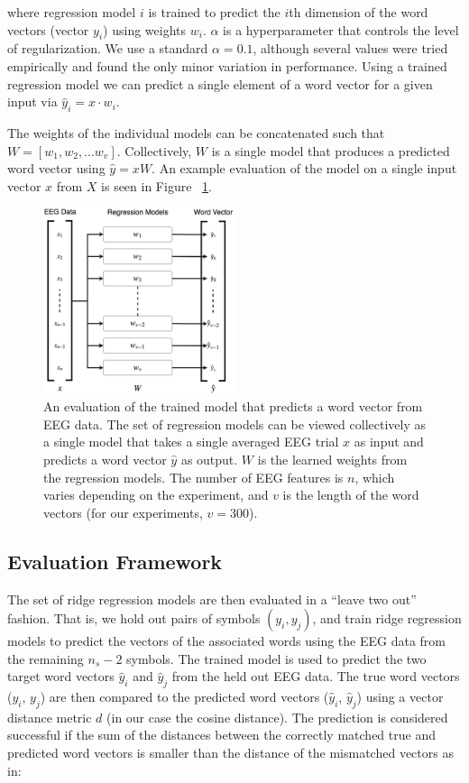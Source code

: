 \noindent where regression model $i$ is trained to predict the $i$th dimension of the word vectors (vector $y_i$) using weights $w_i$. $\alpha$ is a hyperparameter that controls the level of regularization. We use a standard $\alpha = 0.1$, although several values were tried empirically and found the only minor variation in performance. Using a trained regression model we can predict a single element of a word vector for a given input via $\hat{y}_i = x \cdot w_i$.

The weights of the individual models can be concatenated such that $W = [ w_1, w_2, ... w_v ]$. Collectively, $W$ is a single model that produces a predicted word vector using $\hat{y} = xW$. An example evaluation of the model on a single input vector $x$ from $X$ is seen in Figure ~\ref{fig:features}.

\begin{figure}[t]
  \centering
  \includegraphics[width=0.5\textwidth]{figures/features}
  \caption{An evaluation of the trained model that predicts a word vector from EEG data. The set of regression models can be viewed collectively as a single model that takes a single averaged EEG trial $x$ as input and predicts a word vector $\hat{y}$ as output. $W$ is the learned weights from the regression models. The number of EEG features is $n$, which varies depending on the experiment, and $v$ is the length of the word vectors (for our experiments, $v=300$).}
  \label{fig:features}
\end{figure}

\subsection{Evaluation Framework}
The set of ridge regression models are then evaluated in a ``leave two out'' fashion. That is, we hold out pairs of symbols $(y_i, y_j)$, and train ridge regression models to predict the vectors of the associated words using the EEG data from the remaining $n_s-2$ symbols.  The trained model is used to predict the two target word vectors $\hat{y}_i$ and $\hat{y}_j$ from the held out EEG data. The true word vectors ($y_i$, $y_j$) are then compared to the predicted word vectors ($\hat{y}_i$, $\hat{y}_j$) using a vector distance metric $d$ (in our case the cosine distance). The prediction is considered successful if the sum of the distances between the correctly matched true and predicted word vectors is smaller than the distance of the mismatched vectors as in: 
  
